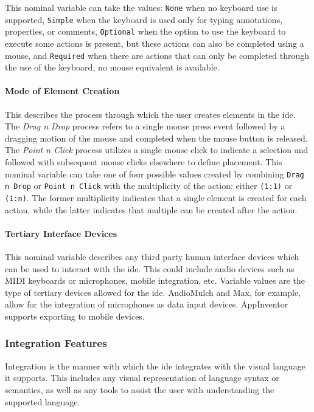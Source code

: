 This nominal variable can take the values:
\texttt{None} when no keyboard use is supported,
\texttt{Simple} when the keyboard is used only for typing annotations, properties, or comments,
\texttt{Optional} when the option to use the keyboard to execute some actions is present, but these actions can also be completed using a mouse,
and \texttt{Required} when there are actions that can only be completed through the use of the keyboard, no mouse equivalent is available.


\paragraph{Mode of Element Creation}
This describes the process through which the user creates elements in the \ac{ide}.
The \emph{Drag n Drop} process refers to a single mouse press event followed by a dragging motion of the mouse and completed when the mouse button is released.
The \emph{Point n Click} process utilizes a single mouse click to indicate a selection and followed with subsequent mouse clicks elsewhere to define placement.
This nominal variable can take one of four possible values created by
combining \texttt{Drag n Drop} or \texttt{Point n Click} with the
multiplicity of the action: either \texttt{(1:1)} or \texttt{(1:n)}. The
former multiplicity indicates that a single element is created for each
action, while the latter indicates that multiple can be created after the
action.


\paragraph{Tertiary Interface Devices}
This nominal variable describes any
third party human interface devices which can be used to interact with the
\ac{ide}. This could include audio devices such as MIDI keyboards or
microphones, mobile integration, etc. Variable values are the type of
tertiary devices allowed for the \ac{ide}. AudioMulch and Max, for example,
allow for the integration of microphones as data input devices. AppInventor
supports exporting to mobile devices.


\subsubsection{Integration Features} \label{subsubsec:integration}

Integration is the manner with which the \ac{ide} integrates with the visual
language it supports. This includes any visual representation of language
syntax or semantics, as well as any tools to assist the user with
understanding the supported language.


